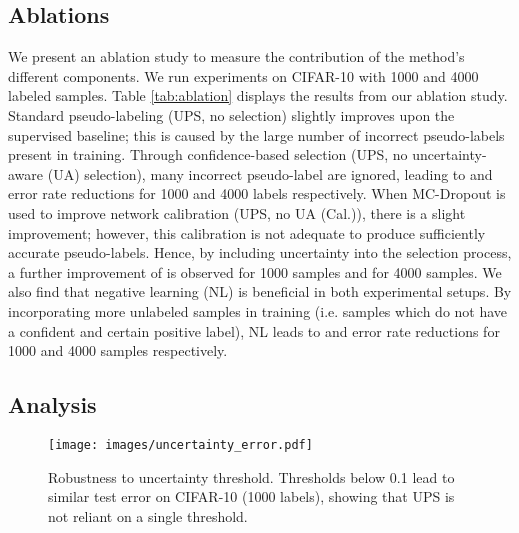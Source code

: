 \documentclass{article} \usepackage{iclr2021_conference,times}
\begin{document}
\subsection{Ablations}
\label{sec:ablation}
We present an ablation study to measure the contribution of the method's different components. We run experiments on CIFAR-10 with 1000 and 4000 labeled samples. Table \ref{tab:ablation} displays the results from our ablation study. Standard pseudo-labeling (UPS, no selection) slightly improves upon the supervised baseline; this is caused by the large number of incorrect pseudo-labels present in training. Through confidence-based selection (UPS, no uncertainty-aware (UA) selection), many incorrect pseudo-label are ignored, leading to  and  error rate reductions for 1000 and 4000 labels respectively. When MC-Dropout is used to improve network calibration (UPS, no UA (Cal.)), there is a slight improvement; however, this calibration is not adequate to produce sufficiently accurate pseudo-labels. Hence, by including uncertainty into the selection process, a further improvement of  is observed for 1000 samples and  for 4000 samples. We also find that negative learning (NL) is beneficial in both experimental setups. By incorporating more unlabeled samples in training (i.e. samples which do not have a confident and certain positive label), NL leads to  and  error rate reductions for 1000 and 4000 samples respectively.



\subsection{Analysis}



\begin{wrapfigure}{r}{0.48\linewidth}
\vspace{-4mm}


\centering
\texttt{[image: images/uncertainty\_error.pdf]}

\caption{Robustness to uncertainty threshold. Thresholds below 0.1 lead to similar test error on CIFAR-10 (1000 labels), showing that UPS is not reliant on a single threshold.}
\label{fig:uncertaintyrobust}
\vspace{-2.5mm}
\end{wrapfigure}
\end{document}
